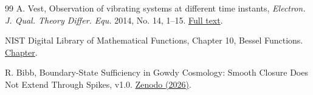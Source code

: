 \documentclass[11pt]{article}
\begin{document}
\begin{thebibliography}{99}
 A. Vest, Observation of vibrating systems at different time
instants, \emph{Electron. J. Qual. Theory Differ. Equ.} 2014, No. 14, 1--15.
\href{https://www.math.u-szeged.hu/ejqtde/p2411.pdf}{Full text}.

 NIST Digital Library of Mathematical Functions,
Chapter 10, Bessel Functions. \href{https://dlmf.nist.gov/10}{Chapter}.

 R. Bibb, Boundary-State Sufficiency in Gowdy Cosmology:
Smooth Closure Does Not Extend Through Spikes, v1.0.
\href{https://doi.org/10.5281/zenodo.21959052}{Zenodo (2026)}.
\end{thebibliography}
\end{document}
